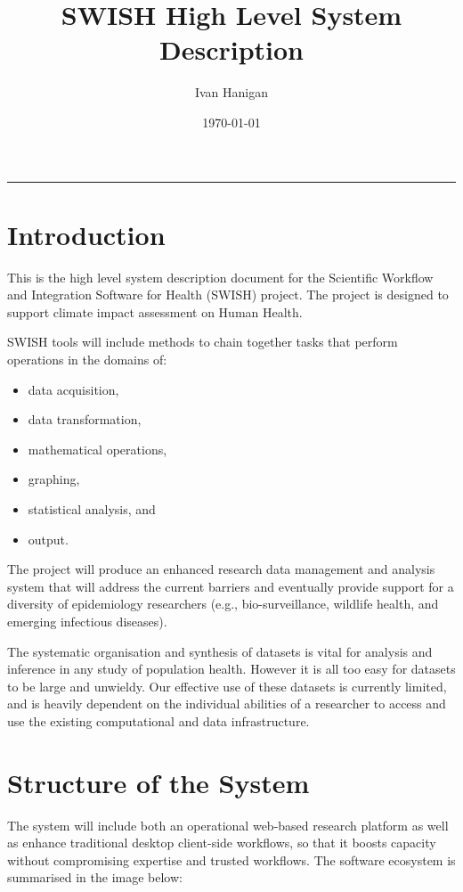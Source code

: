 \documentclass[a4paper]{article}
\title{SWISH High Level System Description}
\author{Ivan Hanigan}
\date{\today}
\begin{document}
\maketitle

\tableofcontents
\hrule

\section{Introduction}
\label{sec-1}

This is the high level system description document for the Scientific Workflow and Integration Software for Health (SWISH) project.  The project is designed to support climate impact assessment on Human Health.

SWISH tools will include methods to chain together tasks that perform operations in the domains of:

\begin{itemize}
\item data acquisition,
\item data transformation,
\item mathematical operations,
\item graphing,
\item statistical analysis, and
\item output.
\end{itemize}

The project will produce an enhanced research data management and analysis system that will address the current barriers and eventually provide support for a diversity of epidemiology researchers (e.g., bio-surveillance, wildlife health, and emerging infectious diseases).

The systematic organisation and synthesis of datasets is vital for analysis and inference in any study of population health. However it is all too easy for datasets to be large and unwieldy. Our effective use of these datasets is currently limited, and is heavily dependent on the individual abilities of a researcher to access and use the existing computational and data infrastructure. 
\section{Structure of the System}
\label{sec-2}

The system will include both an operational web-based research platform as well as enhance traditional desktop client-side workflows, so that it boosts capacity without compromising expertise and trusted workflows. The software ecosystem is summarised in the image below:
\end{document}
